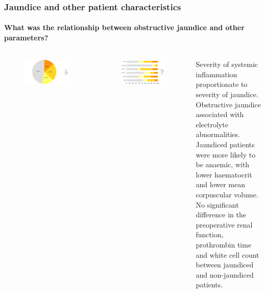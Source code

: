 \documentclass[10pt]{beamer}
\begin{document}
\begin{frame}
	\frametitle{Jaundice and other patient characteristics}
	\framesubtitle{What was the relationship between obstructive jaundice and other parameters?}
	
	\begin{columns}
		
		\begin{figure}
			\includegraphics[width=\textwidth]{jaundice_distribution}
		\end{figure}
		
		\begin{figure}
			\includegraphics[width=\textwidth]{jaundice_vs_patient_factors}
		\end{figure}
		\pause		
		{\scriptsize			
			Severity of systemic inflammation proportionate to severity of jaundice. \\
			\medskip
			Obstructive jaundice associated with electrolyte abnormalities.\\
			\medskip
			Jaundiced patients were more likely to be anaemic, with lower haematocrit and lower mean corpuscular volume.\\
			\medskip
			No significant difference in the preoperative renal function, prothrombin time and white cell count between jaundiced and non-jaundiced patients.\\
		}
	\end{columns}
\end{frame}
\end{document}
